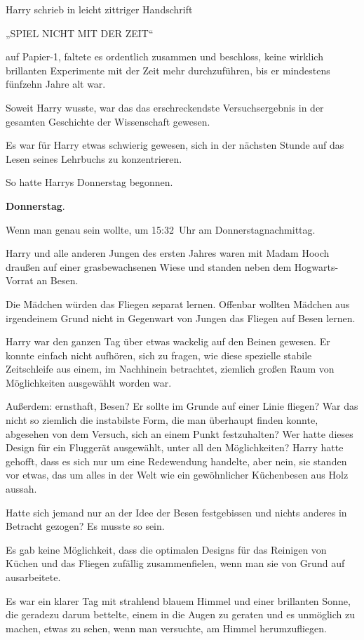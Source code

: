 {Harry schrieb in leicht zittriger Handschrift

„SPIEL NICHT MIT DER ZEIT“

auf Papier-1, faltete es ordentlich zusammen und beschloss, keine wirklich brillanten Experimente mit der Zeit mehr durchzuführen, bis er mindestens fünfzehn Jahre alt war.

Soweit Harry wusste, war das das erschreckendste Versuchsergebnis in der gesamten Geschichte der Wissenschaft gewesen.

Es war für Harry etwas schwierig gewesen, sich in der nächsten Stunde auf das Lesen seines Lehrbuchs zu konzentrieren.

So hatte Harrys Donnerstag begonnen.

\textbf{Donnerstag}.

Wenn man genau sein wollte, um 15:32~Uhr am Donnerstagnachmittag.

Harry und alle anderen Jungen des ersten Jahres waren mit Madam Hooch draußen auf einer grasbewachsenen Wiese und standen neben dem Hogwarts-Vorrat an Besen.

Die Mädchen würden das Fliegen separat lernen. Offenbar wollten Mädchen aus irgendeinem Grund nicht in Gegenwart von Jungen das Fliegen auf Besen lernen.

Harry war den ganzen Tag über etwas wackelig auf den Beinen gewesen. Er konnte einfach nicht aufhören, sich zu fragen, wie diese spezielle stabile Zeitschleife aus einem, im Nachhinein betrachtet, ziemlich großen Raum von Möglichkeiten ausgewählt worden war.

Außerdem: ernsthaft, Besen? Er sollte im Grunde auf einer Linie fliegen? War das nicht so ziemlich die instabilste Form, die man überhaupt finden konnte, abgesehen von dem Versuch, sich an einem Punkt festzuhalten? Wer hatte dieses Design für ein Fluggerät ausgewählt, unter all den Möglichkeiten? Harry hatte gehofft, dass es sich nur um eine Redewendung handelte, aber nein, sie standen vor etwas, das um alles in der Welt wie ein gewöhnlicher Küchenbesen aus Holz aussah.

Hatte sich jemand nur an der Idee der Besen festgebissen und nichts anderes in Betracht gezogen? Es musste so sein.

Es gab keine Möglichkeit, dass die optimalen Designs für das Reinigen von Küchen und das Fliegen zufällig zusammenfielen, wenn man sie von Grund auf ausarbeitete.

Es war ein klarer Tag mit strahlend blauem Himmel und einer brillanten Sonne, die geradezu darum bettelte, einem in die Augen zu geraten und es unmöglich zu machen, etwas zu sehen, wenn man versuchte, am Himmel herumzufliegen.

}
